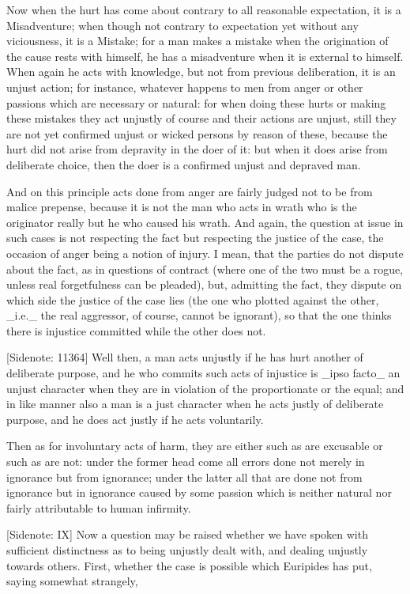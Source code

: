 Now when the hurt has come about contrary to all reasonable expectation,
it is a Misadventure; when though not contrary to expectation yet
without any viciousness, it is a Mistake; for a man makes a mistake when
the origination of the cause rests with himself, he has a misadventure
when it is external to himself. When again he acts with knowledge, but
not from previous deliberation, it is an unjust action; for instance,
whatever happens to men from anger or other passions which are necessary
or natural: for when doing these hurts or making these mistakes they act
unjustly of course and their actions are unjust, still they are not yet
confirmed unjust or wicked persons by reason of these, because the hurt
did not arise from depravity in the doer of it: but when it does arise
from deliberate choice, then the doer is a confirmed unjust and depraved
man.

And on this principle acts done from anger are fairly judged not to be
from malice prepense, because it is not the man who acts in wrath who
is the originator really but he who caused his wrath. And again,
the question at issue in such cases is not respecting the fact but
respecting the justice of the case, the occasion of anger being a notion
of injury. I mean, that the parties do not dispute about the fact, as in
questions of contract (where one of the two must be a rogue, unless real
forgetfulness can be pleaded), but, admitting the fact, they dispute on
which side the justice of the case lies (the one who plotted against the
other, _i.e._ the real aggressor, of course, cannot be ignorant), so
that the one thinks there is injustice committed while the other does
not.

[Sidenote: 11364] Well then, a man acts unjustly if he has hurt another
of deliberate purpose, and he who commits such acts of injustice is
_ipso facto_ an unjust character when they are in violation of the
proportionate or the equal; and in like manner also a man is a just
character when he acts justly of deliberate purpose, and he does act
justly if he acts voluntarily.

Then as for involuntary acts of harm, they are either such as are
excusable or such as are not: under the former head come all errors done
not merely in ignorance but from ignorance; under the latter all that
are done not from ignorance but in ignorance caused by some passion
which is neither natural nor fairly attributable to human infirmity.

[Sidenote: IX] Now a question may be raised whether we have spoken with
sufficient distinctness as to being unjustly dealt with, and dealing
unjustly towards others. First, whether the case is possible which
Euripides has put, saying somewhat strangely,

